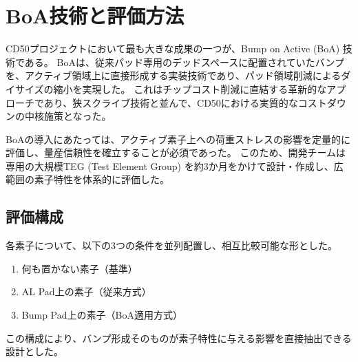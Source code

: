 \documentclass[conference]{IEEEtran}
\begin{document}
\section{BoA技術と評価方法}
CD50プロジェクトにおいて最も大きな成果の一つが、Bump on Active (BoA) 技術である。  
BoAは、従来パッド専用のデッドスペースに配置されていたバンプを、アクティブ領域上に直接形成する実装技術であり、パッド領域削減によるダイサイズの縮小を実現した。  
これはチップコスト削減に直結する革新的なアプローチであり、狭スクライブ技術と並んで、CD50における実質的なコストダウンの中核施策となった。

BoAの導入にあたっては、アクティブ素子上への荷重ストレスの影響を定量的に評価し、量産信頼性を確立することが必須であった。  
このため、開発チームは専用の大規模TEG (Test Element Group) を約3か月をかけて設計・作成し、広範囲の素子特性を体系的に評価した。  

\subsection{評価構成}
各素子について、以下の3つの条件を並列配置し、相互比較可能な形とした。
\begin{enumerate}
  \item 何も置かない素子（基準）
  \item AL Pad上の素子（従来方式）
  \item Bump Pad上の素子（BoA適用方式）
\end{enumerate}
この構成により、バンプ形成そのものが素子特性に与える影響を直接抽出できる設計とした。

\end{document}
